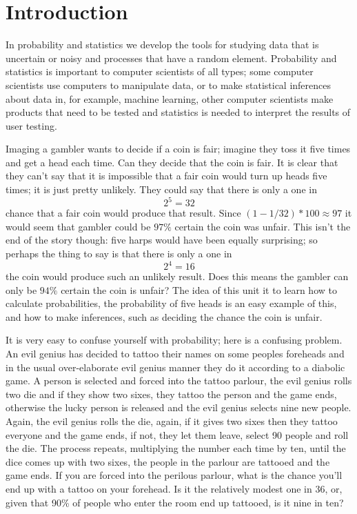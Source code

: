 \documentclass[11pt,a4paper]{scrartcl}
\begin{document}
\section*{Introduction}

In probability and statistics we develop the tools for studying data
that is uncertain or noisy and processes that have a random
element. Probability and statistics is important to computer
scientists of all types; some computer scientists use computers to
manipulate data, or to make statistical inferences about data in, for
example, machine learning, other computer scientists make products
that need to be tested and statistics is needed to interpret the
results of user testing.

Imaging a gambler wants to decide if a coin is fair; imagine they toss
it five times and get a head each time. Can they decide that the coin is
fair. It is clear that they can't say that it is
impossible that a fair coin would turn up heads five times; it is just
pretty unlikely. They could say that there is only a one in
\begin{equation}
2^{5}=32
\end{equation}
chance that a fair coin would produce that result. Since
$(1-1/32)*100\approx 97$ it would seem that gambler could be $97\%$
certain the coin was unfair. This isn't the end of the story though:
five harps would have been equally surprising; so perhaps the thing to
say is that there is only a one in
\begin{equation}
2^{4}=16
\end{equation}
the coin would produce such an unlikely result. Does this means the
gambler can only be $94\%$ certain the coin is unfair? The idea of
this unit it to learn how to calculate probabilities, the probability
of five heads is an easy example of this, and how to make inferences,
such as deciding the chance the coin is unfair.


It is very easy to confuse yourself with probability; here is a
confusing problem. An evil genius has decided to tattoo their names on
some peoples foreheads and in the usual over-elaborate evil genius
manner they do it according to a diabolic game. A person is selected
and forced into the tattoo parlour, the evil genius rolls two die and
if they show two sixes, they tattoo the person and the game ends,
otherwise the lucky person is released and the evil genius selects
nine new people. Again, the evil genius rolls the die, again, if it
gives two sixes then they tattoo everyone and the game ends, if not,
they let them leave, select 90 people and roll the die. The process
repeats, multiplying the number each time by ten, until the dice comes
up with two sixes, the people in the parlour are tattooed and the game
ends. If you are forced into the perilous parlour, what is the chance you'll
end up with a tattoo on your forehead. Is it the relatively modest one
in 36, or, given that 90\% of people who enter the room end up
tattooed, is it nine in ten?
\end{document}
